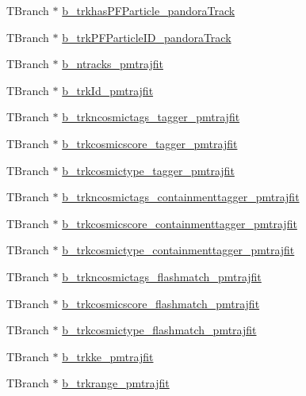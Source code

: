 \begin{DoxyCompactItemize}
\item 
T\-Branch $\ast$ \hyperlink{classanatree_a05c70e021e024a1915de70f58afbd422}{b\-\_\-trkhas\-P\-F\-Particle\-\_\-pandora\-Track}
\item 
T\-Branch $\ast$ \hyperlink{classanatree_ae4bfbd92a467559a355e5092af30b46b}{b\-\_\-trk\-P\-F\-Particle\-I\-D\-\_\-pandora\-Track}
\item 
T\-Branch $\ast$ \hyperlink{classanatree_a4277265208cbc22ab65154db98d20ed4}{b\-\_\-ntracks\-\_\-pmtrajfit}
\item 
T\-Branch $\ast$ \hyperlink{classanatree_a56ec5e0a46e5ebae17574ee67192fa7e}{b\-\_\-trk\-Id\-\_\-pmtrajfit}
\item 
T\-Branch $\ast$ \hyperlink{classanatree_a2d347ece74a7feaa3b3b6f84cfcc6762}{b\-\_\-trkncosmictags\-\_\-tagger\-\_\-pmtrajfit}
\item 
T\-Branch $\ast$ \hyperlink{classanatree_a96393f76e6144f2247e0ef1a2ea6a23f}{b\-\_\-trkcosmicscore\-\_\-tagger\-\_\-pmtrajfit}
\item 
T\-Branch $\ast$ \hyperlink{classanatree_a258a0dcb534bcb3445a0e776f4a8f919}{b\-\_\-trkcosmictype\-\_\-tagger\-\_\-pmtrajfit}
\item 
T\-Branch $\ast$ \hyperlink{classanatree_aa28179040a444e1a0406d75a9613f6a6}{b\-\_\-trkncosmictags\-\_\-containmenttagger\-\_\-pmtrajfit}
\item 
T\-Branch $\ast$ \hyperlink{classanatree_a0bb8556488bdf0db83ed7e69c382eaa2}{b\-\_\-trkcosmicscore\-\_\-containmenttagger\-\_\-pmtrajfit}
\item 
T\-Branch $\ast$ \hyperlink{classanatree_a1fa7878ea1a693f4881989480cda2414}{b\-\_\-trkcosmictype\-\_\-containmenttagger\-\_\-pmtrajfit}
\item 
T\-Branch $\ast$ \hyperlink{classanatree_a102fec579615dd3c32ffc3af660db375}{b\-\_\-trkncosmictags\-\_\-flashmatch\-\_\-pmtrajfit}
\item 
T\-Branch $\ast$ \hyperlink{classanatree_a2f607a0a29a2e7eaaefad1255c36f378}{b\-\_\-trkcosmicscore\-\_\-flashmatch\-\_\-pmtrajfit}
\item 
T\-Branch $\ast$ \hyperlink{classanatree_a97ff55d779c97fcb01671ebc648a5a2b}{b\-\_\-trkcosmictype\-\_\-flashmatch\-\_\-pmtrajfit}
\item 
T\-Branch $\ast$ \hyperlink{classanatree_ac6d21bd2aa391cbe593b3a8d60e9d75b}{b\-\_\-trkke\-\_\-pmtrajfit}
\item 
T\-Branch $\ast$ \hyperlink{classanatree_ad06f3f694380e0595b922f65a2a08f8c}{b\-\_\-trkrange\-\_\-pmtrajfit}
\item 

\end{DoxyCompactItemize}
